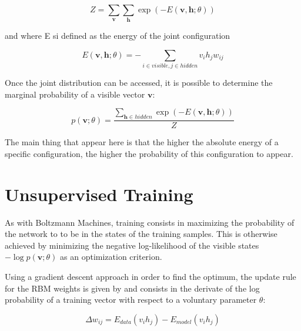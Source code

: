 \documentclass{report}
\begin{document}
	\vspace{0.5cm}
	\begin{equation}
	Z = \sum_{\textbf{v}}\sum_{\textbf{h}}\exp (-E(\textbf{v}, \textbf{h}; \theta))
	\end{equation}
	\vspace{0.5cm}	
		
	and where E si defined as the energy of the joint configuration
	
	\vspace{0.5cm}
	\begin{equation}
	E(\textbf{v}, \textbf{h}; \theta) = - \sum_{i\in visible,j \in hidden}v_ih_jw_{ij}
	\end{equation}
	\vspace{0.5cm}
	
	Once the joint distribution can be accessed, it is possible to determine the
	marginal probability of a visible vector $\textbf{v}$:
	
	\vspace{0.5cm}
	\begin{equation}
	p (\textbf{v}; \theta ) =\frac{\sum_{\textbf{h} \in hidden} \exp (-E (\textbf{v}, \textbf{h}; \theta))}{Z}
	\end{equation}
	\vspace{0.5cm}
	
	The main thing that appear here is that the higher the absolute energy of a specific configuration, the higher the probability of this configuration to appear.
	
	\section{Unsupervised Training}
	
	As with Boltzmann Machines, training consists in maximizing the probability of 
	the network to to be in the states of the training samples. This is otherwise 
	achieved by minimizing the negative log-likelihood of the visible states 
	$-\log p (\textbf{v}; \theta)$ as an optimization criterion. 
	
	Using a gradient descent approach in order to find the optimum, the update 
	rule for the RBM weights is given by \cite{nagatani2014restricted} and consists in the derivate of the log probability of a training vector with respect to a voluntary parameter $\theta$:
	
	\vspace{0.5cm}
	\begin{equation} \label{gradient_update}
	\Delta w_{ij} = E_{data}(v_i h_j) - E_{model}(v_i h_j) 
	\end{equation}
	\vspace{0.5cm}
	
\end{document}

